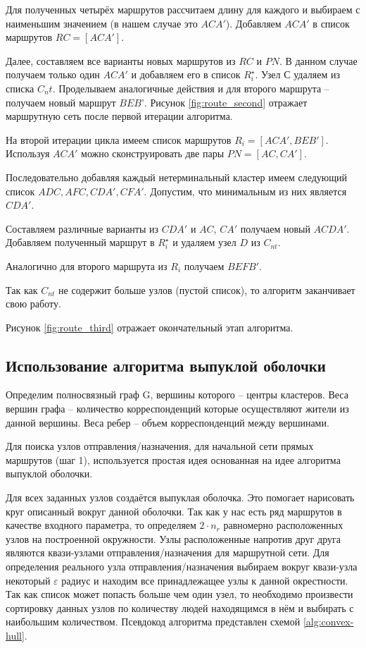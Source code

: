 Для полученных четырёх маршрутов рассчитаем длину для каждого и выбираем с наименьшим значением 
(в нашем случае это \( ACA' \)). Добавляем \( ACA' \) в список маршрутов \( RC = [ACA'] \).

Далее, составляем все варианты новых маршрутов из \( RC \) и \( PN \). В данном случае получаем только один 
\( ACA' \) и добавляем его в список \( R^{\star}_{i} \). Узел \( С \) удаляем из списка \( C_nt \).
Проделываем аналогичные действия и для второго маршрута -- получаем новый маршрут \( BEB’ \).
Рисунок \ref{fig:route_second} отражает маршрутную сеть после первой итерации алгоритма.

На второй итерации цикла имеем список маршрутов \( R_i = [ACA', BEB'] \). Используя \( ACA' \) можно 
сконструировать две пары \( PN=[AC, CA'] \).

Последовательно добавляя каждый нетерминальный кластер имеем следующий список \( ADC, AFC, CDA', CFA' \). 
Допустим, что минимальным из них является \( CDA' \).

Составляем различные варианты из \( CDA' \) и \( AC \), \( CA' \) получаем новый \( ACDA' \). Добавляем 
полученный маршрут в \( R^{\star}_i \) и удаляем узел \( D \) из \( C_{nt} \).

Аналогично для второго маршрута из \( R_i \) получаем \( BEFB' \).

Так как \( C_{nt} \) не содержит больше узлов (пустой список), то алгоритм заканчивает свою работу.

Рисунок \ref{fig:route_third} отражает окончательный этап алгоритма.

\subsection{Использование алгоритма выпуклой оболочки}
Определим полносвязный граф G, вершины которого -- центры кластеров. Веса вершин графа -- количество 
корреспонденций которые осуществляют жители из данной вершины. Веса ребер -- объем корреспонденций между 
вершинами.

Для поиска узлов отправления/назначения, для начальной сети прямых маршрутов (шаг 1), используется простая 
идея основанная на идее алгоритма выпуклой оболочки.

Для всех заданных узлов создаётся выпуклая оболочка. Это помогает нарисовать круг описанный вокруг данной
оболочки. Так как у нас есть ряд маршрутов в качестве входного параметра, то определяем \( 2\cdot n_r \) 
равномерно расположенных узлов на построенной окружности. Узлы расположенные напротив друг друга являются 
квази-узлами отправления/назначения для маршрутной сети. Для определения реального узла отправления/назначения 
выбираем вокруг квази-узла некоторый \( \varepsilon \) радиус и находим все принадлежащее узлы к данной 
окрестности. Так как список может попасть больше чем один узел, то необходимо произвести сортировку данных 
узлов по количеству людей находящимся в нём и выбирать с наибольшим количеством. Псевдокод алгоритма 
представлен схемой \ref{alg:convex-hull}.

